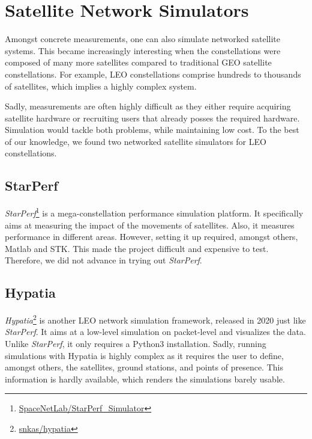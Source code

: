\section{Satellite Network Simulators} \label{sec:satellite_network_simulators}

Amongst concrete measurements, one can also simulate networked satellite
systems. This became increasingly interesting when the constellations were
composed of many more satellites compared to traditional \ac{GEO} satellite
constellations. For example, \ac{LEO} constellations comprise hundreds to
thousands of satellites, which implies a highly complex system.

Sadly, measurements are often highly difficult as they either require acquiring
satellite hardware or recruiting users that already posses the required
hardware. Simulation would tackle both problems, while maintaining low cost. To
the best of our knowledge, we found two networked satellite simulators for
\ac{LEO} constellations.

\subsection{StarPerf} \label{sec:starperf}

\textit{StarPerf}\footnote{\href{https://github.com/SpaceNetLab/StarPerf\_Simulator}{SpaceNetLab/StarPerf\_Simulator}}
\cite{DBLP:conf/icnp/LaiLL20} is a mega-constellation performance simulation
platform. It specifically aims at measuring the impact of the movements of
satellites. Also, it measures performance in different areas. However, setting
it up required, amongst others, Matlab and STK. This made the project difficult
and expensive to test. Therefore, we did not advance in trying out
\textit{StarPerf}.

\subsection{Hypatia} \label{sec:hypatia}

\textit{Hypatia}\footnote{\href{https://github.com/snkas/hypatia}{snkas/hypatia}}
\cite{DBLP:conf/imc/KassingBASS20} is another LEO network simulation framework,
released in 2020 just like \textit{StarPerf}. It aims at a low-level simulation
on packet-level and visualizes the data. Unlike \textit{StarPerf}, it only
requires a Python3 installation. Sadly, running simulations with Hypatia is
highly complex as it requires the user to define, amongst others, the
satellites, ground stations, and points of presence. This information is hardly
available, which renders the simulations barely usable.

